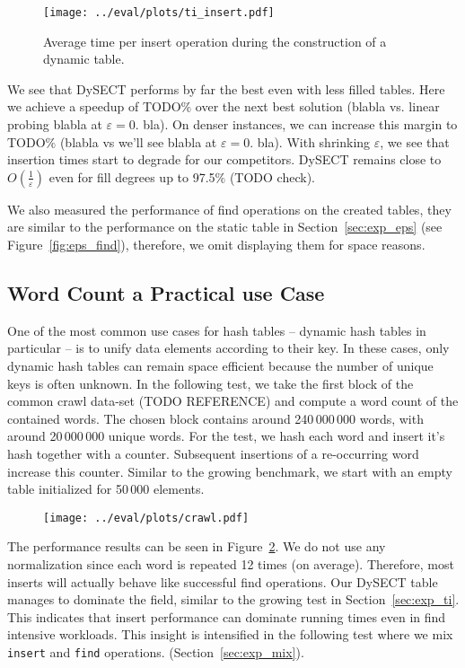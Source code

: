 \documentclass[a4paper,UKenglish]{lipics-v2016}
\begin{document}
\begin{figure}[ht]
  \centering
  \texttt{[image: ../eval/plots/ti\_insert.pdf]}
  \caption{\label{fig:ti_insert}Average time per insert operation
    during the construction of a dynamic table.}
\end{figure}

We see that DySECT performs by far the best even with less filled
tables.  Here we achieve a speedup of TODO$\%$ over the next best
solution (blabla vs. linear probing blabla at $\varepsilon = 0.$ bla).
On denser instances, we can increase this margin to TODO$\%$ (blabla
vs we'll see blabla at $\varepsilon = 0.$ bla).  With shrinking
$\varepsilon$, we see that insertion times start to degrade for our
competitors.  DySECT remains close to $O(\frac{1}{\varepsilon})$ even
for fill degrees up to 97.5$\%$ (TODO check).

We also measured the performance of find operations on the created
tables, they are similar to the performance on the static table in
Section~\ref{sec:exp_eps} (see Figure~\ref{fig:eps_find}), therefore,
we omit displaying them for space reasons.

\subsection{Word Count a Practical use Case}
One of the most common use cases for hash tables -- dynamic hash
tables in particular -- is to unify data elements according to their
key.  In these cases, only dynamic hash tables can remain space
efficient because the number of unique keys is often unknown.  In
the following test, we take the first block of the common crawl
data-set (TODO REFERENCE) and compute a word count of the contained
words.  The chosen block contains around 240\,000\,000 words, with around 20\,000\,000
unique words. For the test, we hash each word and insert it's hash
together with a counter.  Subsequent insertions of a re-occurring word
increase this counter.  Similar to the growing benchmark, we start
with an empty table initialized for 50\,000 elements.

\begin{figure}[ht]
  \centering
  \texttt{[image: ../eval/plots/crawl.pdf]}
  \caption{\label{fig:crawl} }
\end{figure}

The performance results can be seen in Figure~\ref{fig:crawl}.  We do
not use any normalization since each word is repeated 12 times (on
average).  Therefore, most inserts will actually behave like
successful find operations.  Our DySECT table manages to dominate the
field, similar to the growing test in Section~\ref{sec:exp_ti}.  This
indicates that insert performance can dominate running times even in
find intensive workloads.  This insight is intensified in the
following test where we mix \verb~insert~ and \verb~find~ operations.
(Section~\ref{sec:exp_mix}).
\end{document}
